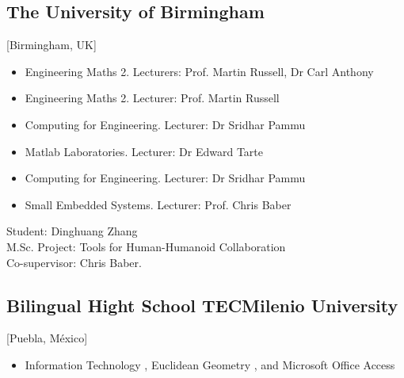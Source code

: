 \documentclass{mycv}
\begin{document}
\subsection{The University of Birmingham}[Birmingham, UK]
\begin{positions}
\end{positions}
\begin{itemize}
	\item Engineering Maths 2. Lecturers: Prof. Martin Russell, Dr Carl Anthony 
	\item Engineering Maths 2. Lecturer: Prof. Martin Russell 
	\item Computing for Engineering. Lecturer: Dr Sridhar Pammu  
	\item Matlab Laboratories. Lecturer: Dr Edward Tarte  
	\item Computing for Engineering. Lecturer: Dr Sridhar Pammu  
	\item Small Embedded Systems. Lecturer: Prof. Chris Baber   \\
\end{itemize}

\begin{positions}
\end{positions}
Student: Dinghuang Zhang \\
M.Sc. Project: Tools for Human-Humanoid Collaboration \\
Co-supervisor: Chris Baber. 

\subsection{Bilingual Hight School TECMilenio University}[Puebla, M\'exico]
\begin{positions}
\end{positions}
\begin{itemize}
	\item
	Information Technology \href{https://sites.google.com/site/perezxochicale/teaching/iit}{\faExternalLink}, 
	Euclidean Geometry  \href{https://sites.google.com/site/perezxochicale/teaching/euclidean-geometry}{\faExternalLink}, and 
	Microsoft Office Access \href{https://sites.google.com/site/perezxochicale/teaching/moa}{\faExternalLink}
\end{itemize}
\end{document}
